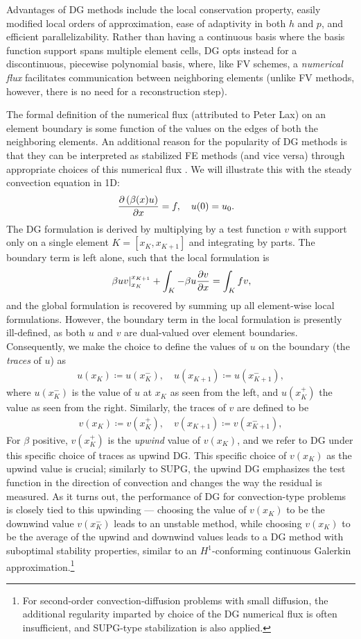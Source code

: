 Advantages of DG methods include the local conservation property, easily modified local orders of approximation, ease of adaptivity in both $h$ and $p$, and efficient parallelizability. Rather than having a continuous basis where the basis function support spans multiple element cells, DG opts instead for a discontinuous, piecewise polynomial basis, where, like FV schemes, a \emph{numerical flux} facilitates communication between neighboring elements (unlike FV methods, however, there is no need for a reconstruction step). 

The formal definition of the numerical flux (attributed to Peter Lax) on an element boundary is some function of the values on the edges of both the neighboring elements.  An additional reason for the popularity of DG methods is that they can be interpreted as stabilized FE methods (and vice versa) through appropriate choices of this numerical flux \cite{Brezzi20063293}. We will illustrate this with the steady convection equation in 1D:
\begin{align*}
\pd{\left(\beta(x) u\right)}{x} = f, \quad u(0) &= u_0.
\end{align*}
The DG formulation is derived by multiplying by a test function $v$ with support only on a single element $K = [x_K,x_{K+1}]$ and integrating by parts. The boundary term is left alone, such that the local formulation is 
\[
\left.\beta u v\right|_{x_K}^{x_{K+1}} + \int_K -\beta u \pd{v}{x} = \int_K f v,
\]
and the global formulation is recovered by summing up all element-wise local formulations. However, the boundary term in the local formulation is presently ill-defined, as both $u$ and $v$ are dual-valued over element boundaries. Consequently, we make the choice to define the values of $u$ on the boundary (the \emph{traces} of $u$) as
\begin{align*}
u(x_K) \coloneqq u(x_K^-), \quad u(x_{K+1}) \coloneqq u(x_{K+1}^-),
\end{align*}
where $u(x_K^-)$ is the value of $u$ at $x_K$ as seen from the left, and $u(x_K^+)$ the value as seen from the right. Similarly, the traces of $v$ are defined to be
\begin{align*}
v(x_K) \coloneqq v(x_K^+), \quad v(x_{K+1}) \coloneqq v(x_{K+1}^-),
\end{align*}
For $\beta$ positive, $v(x_K^+)$ is the \emph{upwind} value of $v(x_K)$, and we refer to DG under this specific choice of traces as upwind DG.  This specific choice of $v(x_K)$ as the upwind value is crucial; similarly to SUPG, the upwind DG emphasizes the test function in the direction of convection and changes the way the residual is measured.  As it turns out, the performance of DG for convection-type problems is closely tied to this upwinding --- choosing the value of $v(x_K)$ to be the downwind value $v(x_K^-)$ leads to an unstable method, while choosing $v(x_K)$ to be the average of the upwind and downwind values leads to a DG method with suboptimal stability properties, similar to an $H^1$-conforming continuous Galerkin approximation\cite{Brezzi20063293}.\footnote{For second-order convection-diffusion problems with small diffusion, the additional regularity imparted by choice of the DG numerical flux is often insufficient, and SUPG-type stabilization is also applied.}

